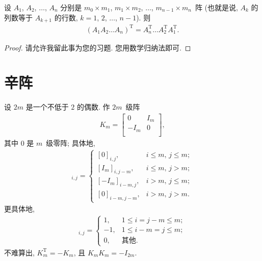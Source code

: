 \begin{theorem}
    设 \(A_1\), \(A_2\), \(\dots\), \(A_n\)
    分别是 \(m_0 \times m_1\), \(m_1 \times m_2\), \(\dots\),
    \(m_{n-1} \times m_n\)~阵
    (也就是说, \(A_k\) 的列数等于 \(A_{k+1}\) 的行数,
    \(k = 1\), \(2\), \(\dots\), \(n-1\)).
    则
    \begin{align*}
        (A_1 A_2 \dots A_n)^{\mathrm{T}}
        = A_n^{\mathrm{T}} \dots A_2^{\mathrm{T}} A_1^{\mathrm{T}}.
    \end{align*}
\end{theorem}

\begin{proof}
    请允许我留此事为您的习题.
    您用数学归纳法即可.
\end{proof}

\section{辛阵}

设 \(2m\) 是一个不低于 \(2\) 的偶数.
作 \(2m\)~级阵
\begin{align*}
    K_m =
    \begin{bmatrix}
        0    & I_m \\
        -I_m & 0   \\
    \end{bmatrix},
\end{align*}
其中 \(0\) 是 \(m\)~级零阵;
具体地,
\begin{align*}
    [K_m]_{i,j} =
    \begin{cases}
        [0]_{i,j},      & \text{\(i \leq m\), \(j \leq m\)}; \\
        [I_m]_{i,j-m},  & \text{\(i \leq m\), \(j > m\)};    \\
        [-I_m]_{i-m,j}, & \text{\(i > m\), \(j \leq m\)};    \\
        [0]_{i-m,j-m},  & \text{\(i > m\), \(j > m\)}.
    \end{cases}
\end{align*}
更具体地,
\begin{align*}
    [K_m]_{i,j} =
    \begin{cases}
        1,  & 1 \leq i = j - m \leq m; \\
        -1, & 1 \leq i - m = j \leq m; \\
        0,  & \text{其他}.
    \end{cases}
\end{align*}
不难算出, \(K_m^{\mathrm{T}} = -K_m\),
且 \(K_m K_m = -I_{2m}\).

